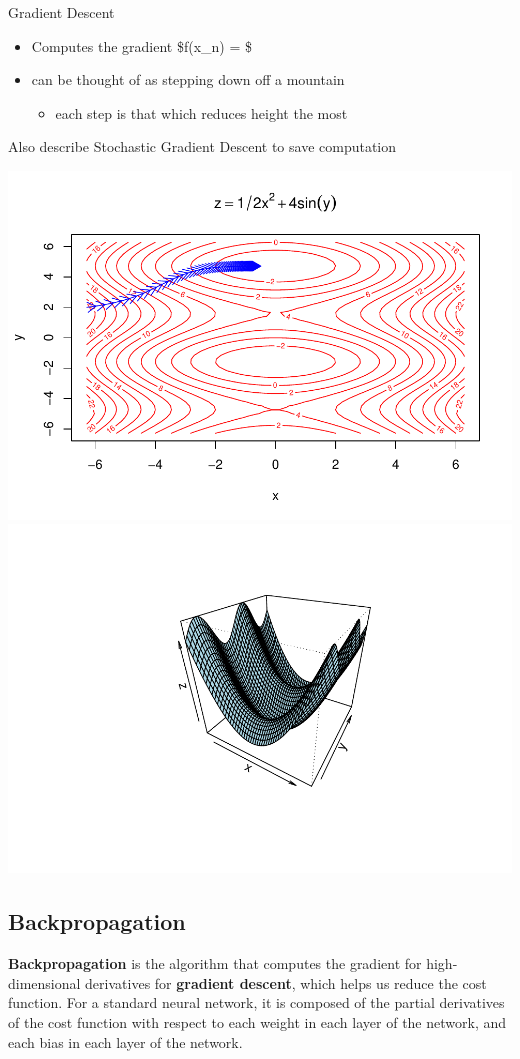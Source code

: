 Gradient Descent

\begin{itemize}
\tightlist
\item
  Computes the gradient \$\nabla f(x\_n) =
   \$
\item
  can be thought of as stepping down off a mountain

  \begin{itemize}
  \tightlist
  \item
    each step is that which reduces height the most
  \end{itemize}
\end{itemize}

Also describe Stochastic Gradient Descent to save computation

    \includegraphics[width = .5\textwidth]{Figures/grad_desc-50.pdf}
    \includegraphics[width = .5\textwidth]{Figures/grad_desc-51.pdf}



\hypertarget{backpropagation}{%
\subsection{Backpropagation}\label{backpropagation}}

\textbf{Backpropagation} is the algorithm that computes the gradient for
high-dimensional derivatives for \textbf{gradient descent}, which helps
us reduce the cost function. For a standard neural network, it is
composed of the partial derivatives of the cost function with respect to
each weight in each layer of the network, and each bias in each layer of
the network.

